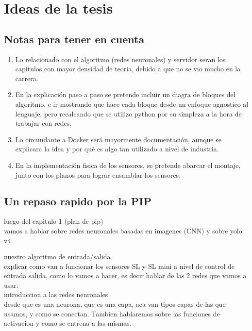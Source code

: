 \chapter{Ideas de la tesis}

\section{Notas para tener en cuenta}

\begin{enumerate}
    \item Lo relacionado con el algoritmo (redes neuronales) y servidor seran los capitulos con mayor densidad de teoria, debido a que no se vio mucho en la carrera.
    \item En la explicación paso a paso se pretende incluir un diagra de bloques del algoritmo, e ir mostrando que hace cada bloque desde un enfoque agnostico al lenguaje, pero recalcando que se utilizo python por su simpleza a la hora de trabajar con redes.
    \item Lo circundante a Docker será mayormente documentación, aunque se explicara la idea y por qué es algo tan utilizado a nivel de industria.
    \item En la implementación fisica de los sensores, se pretende abarcar el montaje, junto con los planos para lograr ensamblar los sensores.
\end{enumerate}

\section{Un repaso rapido por la PIP}

luego del capitulo 1 (plan de pip)\\

vamos a hablar sobre redes neuronales basadas en imagenes (CNN) y sobre yolo v4.

nuestro algoritmo de entrada/salida \\

explicar como van a funcionar los sensores SL y SL mini a nivel de control de entrada salida,
como lo vamos a hacer, es decir hablar de las 2 redes que vamos a usar. \\

introduccion a las redes neuronales \\
desde que es una neurona, que es una capa, aca van tipos capas de las que usamos, y como se conectan. Tambien hablaremos sobre las funciones de activacion y como se entrena a las mismas. \\


